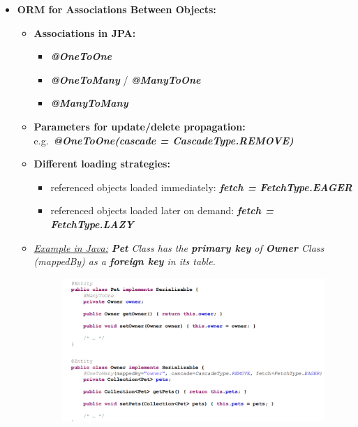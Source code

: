 \documentclass[ieeetran]{article}
\begin{document}
\begin{itemize}
\item \textbf{ORM for Associations Between Objects:}
	\begin{itemize}
	  \item \textbf{Associations in JPA:}
		  \begin{itemize}
		    \item \textbf{\textit{@OneToOne}}
		    \item \textbf{\textit{@OneToMany}} / \textit{\textbf{@ManyToOne}}
		\item \textbf{\textit{@ManyToMany}}
		  \end{itemize}
	\item \textbf{Parameters for update/delete propagation:} e.g.\ \textit{\textbf{@OneToOne(cascade = CascadeType.REMOVE)}}
		\item \textbf{Different loading strategies:}
			\begin{itemize}
			  \item referenced objects loaded immediately: \textit{\textbf{fetch = FetchType.EAGER}}
				  \item referenced objects loaded later on demand: \textit{\textbf{fetch = FetchType.LAZY}}
			\end{itemize}
\item \underline{\textit{Example in Java:}} \textit{\textbf{Pet} Class has the \textbf{primary key} of  \textbf{Owner} Class (mappedBy) as a \textbf{foreign key} in its table.}
	\begin{figure}[h!]
	  \centering
	  \includegraphics[width=0.7\linewidth]{onetoone.png}
	  \label{fig:onetoone_png}
	\end{figure}
	\end{itemize}

\end{itemize}

\pagebreak
\end{document}
